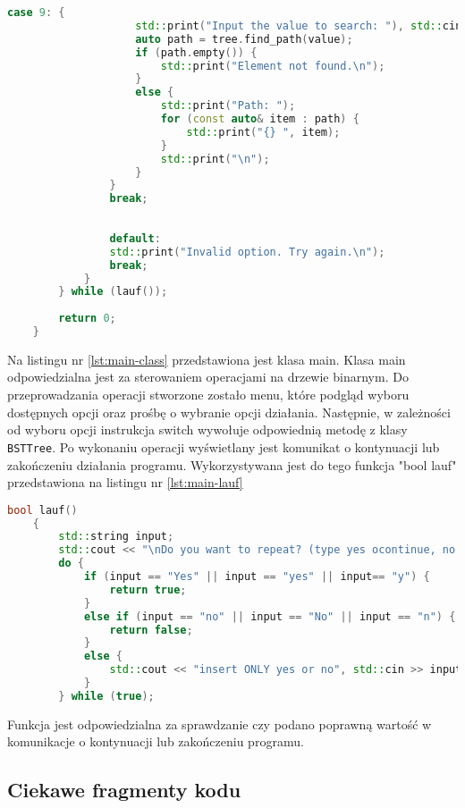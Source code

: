 \begin{lstlisting}[caption=Klasa \texttt{main}, label={lst:main-class}, language=C++]
				case 9: {
					std::print("Input the value to search: "), std::cin >> value;
					auto path = tree.find_path(value);
					if (path.empty()) {
						std::print("Element not found.\n");
					}
					else {
						std::print("Path: ");
						for (const auto& item : path) {
							std::print("{} ", item);
						}
						std::print("\n");
					}
				}
				break;
				
				
				default:
				std::print("Invalid option. Try again.\n");
				break;
			}
		} while (lauf());
		
		return 0;
	}
\end{lstlisting}
Na listingu nr \ref{lst:main-class} przedstawiona jest klasa main. Klasa main odpowiedzialna jest za sterowaniem operacjami na drzewie binarnym. Do przeprowadzania operacji stworzone zostało menu, które podgląd wyboru dostępnych opcji oraz prośbę o wybranie opcji działania.
Następnie, w zależności od wyboru opcji instrukcja switch wywołuje odpowiednią metodę z klasy \texttt{BSTTree}.
Po wykonaniu operacji wyświetlany jest komunikat o kontynuacji lub zakończeniu działania programu. Wykorzystywana jest do tego funkcja "bool lauf" przedstawiona na listingu nr \ref{lst:main-lauf}
\begin{lstlisting}[caption=Klasa \texttt{main}, label={lst:main-lauf}, language=C++]
	bool lauf()
	{
		std::string input;
		std::cout << "\nDo you want to repeat? (type yes ocontinue, no to stop): ", std::cin >> input;
		do {
			if (input == "Yes" || input == "yes" || input== "y") {
				return true;
			}
			else if (input == "no" || input == "No" || input == "n") {
				return false;
			}
			else {
				std::cout << "insert ONLY yes or no", std::cin >> input;
			}
		} while (true);
\end{lstlisting}
Funkcja jest odpowiedzialna za sprawdzanie czy podano poprawną wartość w komunikacje o kontynuacji lub zakończeniu programu.


\subsection{Ciekawe fragmenty kodu}
